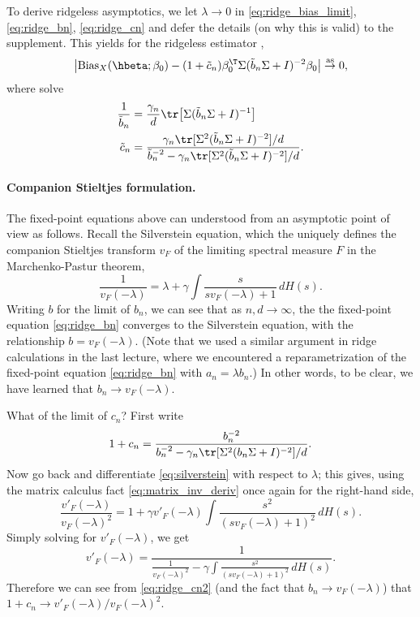 \documentclass{article}
\begin{document}
To derive ridgeless asymptotics, we let $\lambda \to 0$ in
\eqref{eq:ridge_bias_limit}, \eqref{eq:ridge_bn}, \eqref{eq:ridge_cn} and defer
the details (on why this is valid) to the supplement. This yields for the
ridgeless estimator ,
\begin{equation}
\label{eq:ridgeless_bias_limit}
\big| \Bias_X(\hbeta; \beta_0) - (1+\tilde{c}_n) \beta_0^\T \Sigma (\tilde{b}_n
\Sigma + I)^{-2} \beta_0 \big| \asto 0,  
\end{equation}
where  solve
\begin{align}
\label{eq:ridgeless_bn}
\frac{1}{\tilde{b}_n} &= \frac{\gamma_n}{d} \tr \big[ \Sigma (\tilde{b}_n \Sigma
  + I)^{-1} \big]\\  
\label{eq:ridgeless_cn}
\tilde{c}_n &= \frac{\gamma_n \tr [ \Sigma^2 (\tilde{b}_n \Sigma + I)^{-2} ] /
  d}{\tilde{b}_n^{-2} - \gamma_n \tr [ \Sigma^2 (\tilde{b}_n \Sigma + I)^{-2} ]
  / d}. 
\end{align}

\paragraph{Companion Stieltjes formulation.} 

The fixed-point equations above can understood from an asymptotic point of view
as follows. Recall the Silverstein equation, which the uniquely defines the
companion Stieltjes transform $v_F$ of the limiting spectral measure $F$ in the
Marchenko-Pastur theorem,  
\begin{equation}
\label{eq:silverstein}
\frac{1}{v_F(-\lambda)} = \lambda + \gamma \int \frac{s}{s v_F(-\lambda) + 1} \,
dH(s).  
\end{equation}
Writing $b$ for the limit of $b_n$, we can see that as $n,d \to \infty$, the the
fixed-point equation \eqref{eq:ridge_bn} converges to the Silverstein equation,
with the relationship $b = v_F(-\lambda)$. (Note that we used a similar argument
in ridge calculations in the last lecture, where we encountered a
reparametrization of the fixed-point equation \eqref{eq:ridge_bn} with $a_n =
\lambda b_n$.) In other words, to be clear, we have learned that $b_n \to
v_F(-\lambda)$.

What of the limit of $c_n$? First write
\begin{equation}
\label{eq:ridge_cn2}
1 + c_n = \frac{b_n^{-2}}{b_n^{-2} - \gamma_n \tr [ \Sigma^2 (b_n \Sigma +
  I)^{-2} ] / d}. 
\end{equation}
Now go back and differentiate \eqref{eq:silverstein} with respect to $\lambda$; 
this gives, using the matrix calculus fact \eqref{eq:matrix_inv_deriv} once
again for the right-hand side,
\[
\frac{v'_F(-\lambda)}{v_F(-\lambda)^2} = 1 + \gamma v'_F(-\lambda) \int
\frac{s^2}{(s v_F(-\lambda) + 1)^2} \, dH(s).
\]
Simply solving for $v'_F(-\lambda)$, we get 
\[
v'_F(-\lambda) = \frac{1}{\frac{1}{v_F(-\lambda)^2} - \gamma \int \frac{s^2}{(s 
    v_F(-\lambda) + 1)^2} \, dH(s)}. 
\]
Therefore we can see from \eqref{eq:ridge_cn2} (and the fact that $b_n \to
v_F(-\lambda)$) that $1+c_n \to v'_F(-\lambda) / v_F(-\lambda)^2$. 
\end{document}
